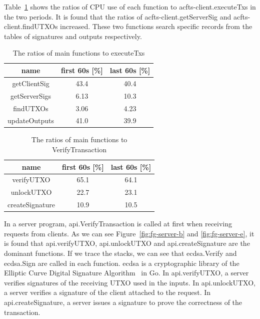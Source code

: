 \documentclass[a4paper, oneside]{discothesis}
\begin{document}
Table~\ref{tbl:bn-client} shows the ratios of CPU use of each function
to acfts-client.executeTxs in the two periods.
It is found that the ratios of acfts-client.getServerSig and acfts-client.findUTXOs increased.
These two functions search specific records from the tables of signatures
and outputs respectively.
\begin{table}[t]
    \begin{center}
        \caption{The ratios of main functions to executeTxs}
        \label{tbl:bn-client}
        \begin{tabular}{|c|c|c|} \hline
            name & first 60s [\%] & last 60s [\%] \\ \hline \hline
            getClientSig & 43.4 & 40.4 \\
            getServerSigs & 6.13 & 10.3 \\
            findUTXOs & 3.06 & 4.23 \\ \hline
            updateOutputs & 41.0 & 39.9 \\ \hline
        \end{tabular}
    \end{center}
\end{table}
\begin{table}[t]
    \begin{center}
        \caption{The ratios of main functions to VerifyTransaction}
        \label{tbl:bn-server}
        \begin{tabular}{|c|c|c|} \hline
            name & first 60s [\%] & last 60s [\%] \\ \hline \hline
            verifyUTXO & 65.1 & 64.1 \\
            unlockUTXO & 22.7 & 23.1 \\
            createSignature & 10.9 & 10.5 \\ \hline
        \end{tabular}
    \end{center}
\end{table}

In a server program, api.VerifyTransaction is called at first
when receiving requests from clients.
As we can see Figure~\ref{fig:fg-server-b} and \ref{fig:fg-server-e}, it is found
that api.verifyUTXO, api.unlockUTXO and api.createSignature are the dominant functions.
If we trace the stacks, we can see that ecdsa.Verify and ecdsa.Sign are called in each function.
ecdsa is a cryptographic library of the Elliptic Curve Digital Signature Algorithm~\cite{ecdsa}
in Go.
In api.verifyUTXO, a server verifies signatures of the receiving UTXO used in the inputs.
In api.unlockUTXO, a server verifies a signature of the client attached to the request.
In api.createSignature, a server issues a signature to prove the correctness of the transaction.
\end{document}
